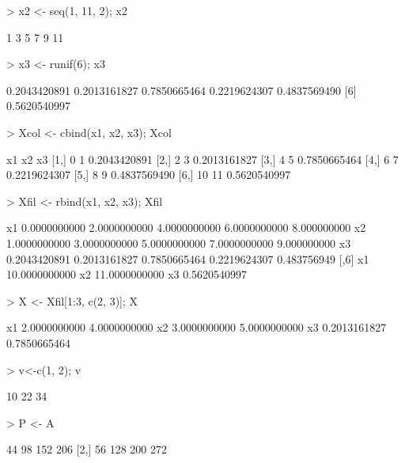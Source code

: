 \documentclass{article}
\begin{document}
\begin{Schunk}
\begin{Soutput}
\end{Soutput}
\begin{Sinput}
> x2 <- seq(1, 11, 2); x2
\end{Sinput}
\begin{Soutput}
[1]  1  3  5  7  9 11
\end{Soutput}
\begin{Sinput}
> x3 <- runif(6); x3
\end{Sinput}
\begin{Soutput}
[1] 0.2043420891 0.2013161827 0.7850665464 0.2219624307 0.4837569490
[6] 0.5620540997
\end{Soutput}
\begin{Sinput}
> Xcol <- cbind(x1, x2, x3); Xcol
\end{Sinput}
\begin{Soutput}
     x1 x2           x3
[1,]  0  1 0.2043420891
[2,]  2  3 0.2013161827
[3,]  4  5 0.7850665464
[4,]  6  7 0.2219624307
[5,]  8  9 0.4837569490
[6,] 10 11 0.5620540997
\end{Soutput}
\begin{Sinput}
> Xfil <- rbind(x1, x2, x3); Xfil
\end{Sinput}
\begin{Soutput}
           [,1]         [,2]         [,3]         [,4]        [,5]
x1 0.0000000000 2.0000000000 4.0000000000 6.0000000000 8.000000000
x2 1.0000000000 3.0000000000 5.0000000000 7.0000000000 9.000000000
x3 0.2043420891 0.2013161827 0.7850665464 0.2219624307 0.483756949
            [,6]
x1 10.0000000000
x2 11.0000000000
x3  0.5620540997
\end{Soutput}
\begin{Sinput}
> X <- Xfil[1:3, c(2, 3)]; X
\end{Sinput}
\begin{Soutput}
           [,1]         [,2]
x1 2.0000000000 4.0000000000
x2 3.0000000000 5.0000000000
x3 0.2013161827 0.7850665464
\end{Soutput}
\begin{Sinput}
> v<-c(1, 2); v %*%A
\end{Sinput}
\begin{Soutput}
     [,1] [,2] [,3]
[1,]   10   22   34
\end{Soutput}
\begin{Sinput}
> P <- A %*% B; P
\end{Sinput}
\begin{Soutput}
     [,1] [,2] [,3] [,4]
[1,]   44   98  152  206
[2,]   56  128  200  272
\end{Soutput}

\end{Schunk}
\end{document}
